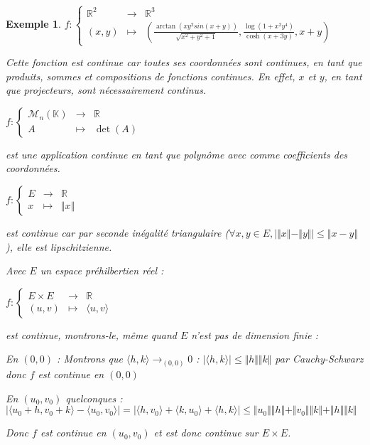 \documentclass[a4paper,12pt]{book}
\newtheorem{Exe}{Exemple}[section]
\def\R{\mathbb{R}}
\def\K{\mathbb{K}}
\begin{document}
\begin{Exe}
$f:\left\{\begin{array}{rcl} \R^2 & \to & \R^3 \\ (x,y) & \mapsto & \left(\frac{\arctan(xy^2sin(x+y))}{\sqrt{x^2+y^2+1}}, \frac{\log(1+x^2y^4)}{\cosh(x+3y)},x+y\right) \end{array}\right.$
\par Cette fonction est continue car toutes ses coordonnées sont continues, en tant que produits, sommes et compositions de fonctions continues. En effet, $x$ et $y$, en tant que projecteurs, sont nécessairement continus.
\par $f:\left\{\begin{array}{rcl} \mathcal{M}_n(\K) & \to & \R \\ A & \mapsto & \det(A) \end{array}\right.$ \par est une application continue en tant que polynôme avec comme coefficients des coordonnées.
\par $f:\left\{\begin{array}{rcl} E & \to & \R \\ x & \mapsto & \Vert x\Vert \end{array}\right.$ \par est continue car par seconde inégalité triangulaire ($\forall x,y\in E, \vert\Vert x\Vert-\Vert y\Vert\vert\leq\Vert x-y\Vert$), elle est lipschitzienne.
\par Avec $E$ un espace préhilbertien réel :
\par $f:\left\{\begin{array}{rcl} E\times E & \to & \R \\ (u,v) & \mapsto & \langle u,v\rangle \end{array}\right.$ \par est continue, montrons-le, même quand $E$ n'est pas de dimension finie :
\par En $(0,0)$ : Montrons que $\langle h,k\rangle\to_{(0,0)}0$ : $\vert\langle h,k\rangle\vert\leq\Vert h\Vert \Vert k\Vert$ par Cauchy-Schwarz donc $f$ est continue en $(0,0)$ \par En $(u_0,v_0)$ quelconques : $\vert\langle u_0+h,v_0+k\rangle - \langle u_0,v_0\rangle\vert = \vert\langle h,v_0\rangle+\langle k,u_0\rangle+\langle h,k\rangle\vert\leq\Vert u_0\Vert\Vert h\Vert+\Vert v_0\Vert\Vert k\Vert+\Vert h\Vert\Vert k\Vert$ \par Donc $f$ est continue en $(u_0,v_0)$ et est donc continue sur $E\times E$.
\end{Exe}
\end{document}
